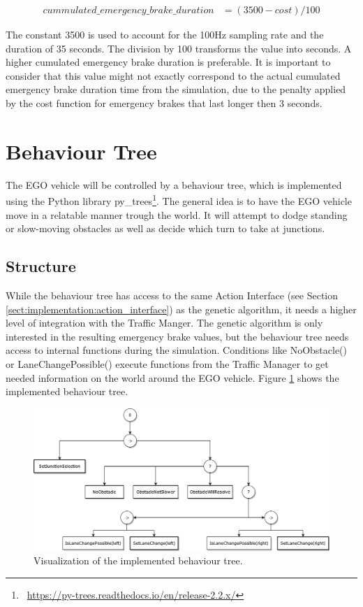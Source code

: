\begin{equation} 
	\begin{split}
		cummulated\_emergency\_brake\_duration & = (3500 - cost) / 100
	\end{split}
	\label{equ:implementation:modified_cost}
\end{equation}

The constant 3500 is used to account for the 100Hz sampling rate and the duration of 35 seconds. The division by 100 transforms the value into seconds. A higher cumulated emergency brake duration is preferable. It is important to consider that this value might not exactly correspond to the actual cumulated emergency brake duration time from the simulation, due to the penalty applied by the cost function for emergency brakes that last longer then 3 seconds.

\section{Behaviour Tree}
The EGO vehicle will be controlled by a behaviour tree, which is implemented using the Python library py\_trees\footnote{~\href{https://py-trees.readthedocs.io/en/release-2.2.x/}{https://py-trees.readthedocs.io/en/release-2.2.x/}}. The general idea is to have the EGO vehicle move in a relatable manner trough the world. It will attempt to dodge standing or slow-moving obstacles as well as decide which turn to take at junctions.

\subsection{Structure}
While the behaviour tree has access to the same Action Interface (see Section \ref{sect:implementation:action_interface}) as the genetic algorithm, it needs a higher level of integration with the Traffic Manger. The genetic algorithm is only interested in the resulting emergency brake values, but the behaviour tree needs access to internal functions during the simulation. Conditions like NoObstacle() or LaneChangePossible() execute functions from the Traffic Manager to get needed information on the world around the EGO vehicle. Figure \ref{fig:implementation:bt} shows the implemented behaviour tree.

\begin{figure}[ht] 
	\includegraphics[width=1\linewidth]{figures/behaviorTree}
	\caption{Visualization of the implemented behaviour tree.}
	\label{fig:implementation:bt}
\end{figure}

